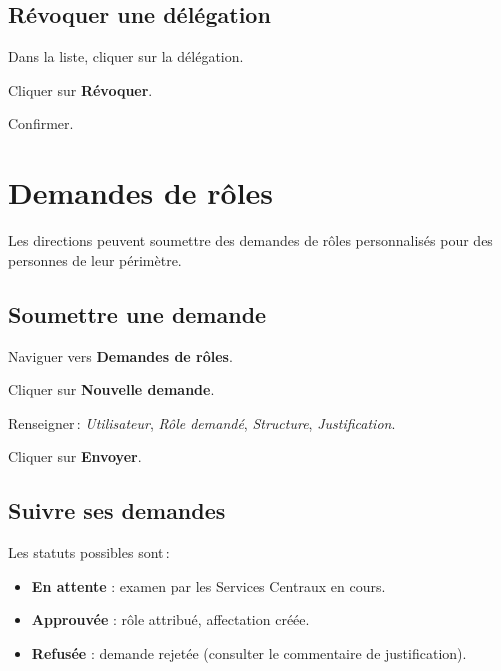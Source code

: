 \subsection{R\'evoquer une d\'el\'egation}

\begin{steps}
  \item Dans la liste, cliquer sur la d\'el\'egation.
  \item Cliquer sur \textbf{R\'evoquer}.
  \item Confirmer.
\end{steps}

\section{Demandes de r\^oles}

Les directions peuvent soumettre des demandes de r\^oles personnalis\'es pour des personnes de leur p\'erim\`etre.

\subsection{Soumettre une demande}

\begin{steps}
  \item Naviguer vers \textbf{Demandes de r\^oles}.
  \item Cliquer sur \textbf{Nouvelle demande}.
  \item Renseigner\,: \textit{Utilisateur}, \textit{R\^ole demand\'e}, \textit{Structure}, \textit{Justification}.
  \item Cliquer sur \textbf{Envoyer}.
\end{steps}


\subsection{Suivre ses demandes}

Les statuts possibles sont\,:
\begin{itemize}
  \item \textbf{En attente} : examen par les Services Centraux en cours.
  \item \textbf{Approuv\'ee} : r\^ole attribu\'e, affectation cr\'e\'ee.
  \item \textbf{Refus\'ee} : demande rejet\'ee (consulter le commentaire de justification).
\end{itemize}

